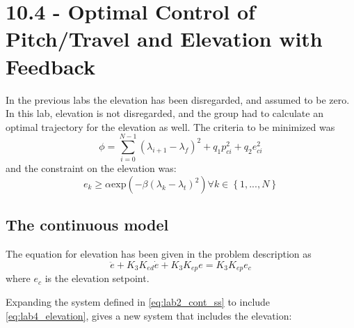 \documentclass[../main.tex]{subfiles}
\begin{document}
\section{10.4 - Optimal Control of Pitch/Travel and Elevation with Feedback}
In the previous labs the elevation has been disregarded, and assumed to be zero. In this lab, elevation is not disregarded, and the group had to calculate an optimal trajectory for the elevation as well. The criteria to be minimized was
\begin{equation}\label{eq:lab4_cost_func}
	\phi = \sum_{i=0}^{N-1} (\lambda_{i + 1} - \lambda_f)^{2} + q_1 p_{ci}^2 + q_2 e_{ci} ^2
\end{equation}
and the constraint on the elevation was:
\begin{equation}\label{eq:lab4_elevation_constraint}
	e_k \geq \alpha \text{exp}\left( -\beta (\lambda_k - \lambda_t)^2\right) \forall k \in \left\lbrace 1,...,N\right\rbrace 
\end{equation}

\subsection{The continuous model}
The equation for elevation has been given in the problem description as
\begin{equation}\label{eq:lab4_elevation}
	\ddot{e} + K_3K_{ed}\dot{e} + K_3K_{ep}e = K_3K_{ep}e_c
\end{equation}
where $ e_c $ is the elevation setpoint.

Expanding the system defined in \cref{eq:lab2_cont_ss} to include \cref{eq:lab4_elevation}, gives a new system that includes the elevation:
\end{document}
